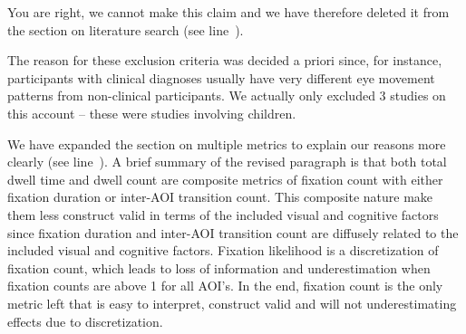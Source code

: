 
You are right, we cannot make this claim and we have therefore deleted it from the section on literature search (see line~). 



The reason for these exclusion criteria was decided a priori since, for instance, participants with clinical diagnoses usually have very different eye movement patterns from non-clinical participants. We actually only excluded 3 studies on this account -- these were studies involving children.



We have expanded the section on multiple metrics to explain our reasons more clearly (see line~). A brief summary of the revised paragraph is that both total dwell time and dwell count are composite metrics of fixation count with either fixation duration or inter-AOI transition count. This composite nature make them less construct valid in terms of the included visual and cognitive factors since fixation duration and inter-AOI transition count are diffusely related to the included visual and cognitive factors. Fixation likelihood is a discretization of fixation count, which leads to loss of information and underestimation when fixation counts are above 1 for all AOI's. In the end, fixation count is the only metric left that is easy to interpret, construct valid and will not underestimating effects due to discretization. 



